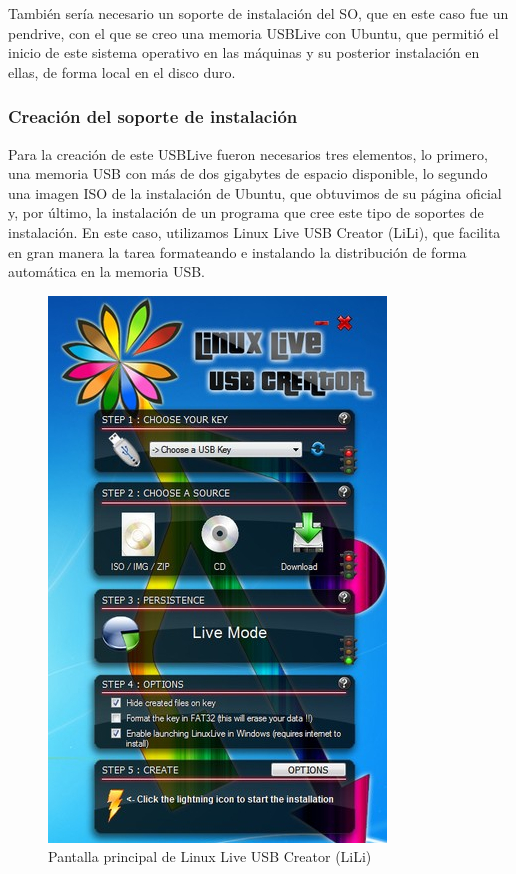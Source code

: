 También sería necesario un soporte de instalación del \gls{SO}, que en este caso fue un pendrive, con el que se creo una memoria \Gls{USBLive} con Ubuntu, que permitió el inicio de este sistema operativo en las máquinas y su posterior instalación en ellas, de forma local en el disco duro.

\subsubsection{Creación del soporte de instalación}

Para la creación de este \Gls{USBLive} fueron necesarios tres elementos, lo primero, una memoria USB con más de dos gigabytes de espacio disponible, lo segundo una imagen ISO de la instalación de Ubuntu, que obtuvimos de su página oficial \cite{ubuntu} y, por último, la instalación de un programa que cree este tipo de soportes de instalación. En este caso, utilizamos Linux Live USB Creator (LiLi), que facilita en gran manera la tarea formateando e instalando la distribución de forma automática en la memoria USB.

\begin{figure}[htp!]
\centering
\caption{Pantalla principal de Linux Live USB Creator (LiLi)}
\label{fig:lili}
\includegraphics[scale=0.7]{graphics/lili}
\end{figure}

